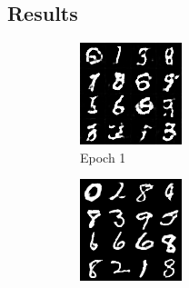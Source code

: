 \documentclass{article}
\begin{document}
\subsection{Results}
\begin{figure}[H]
    \centering
    \begin{subfigure}{.125\textwidth}
        \centering
        \includegraphics[width=.9\linewidth]{GAN_epoch001.png}
        \caption{Epoch 1}
    \end{subfigure}%
    \begin{subfigure}{.125\textwidth}
        \centering
        \includegraphics[width=.9\linewidth]{GAN_epoch010.png}

\end{subfigure}
\end{figure}
\end{document}
